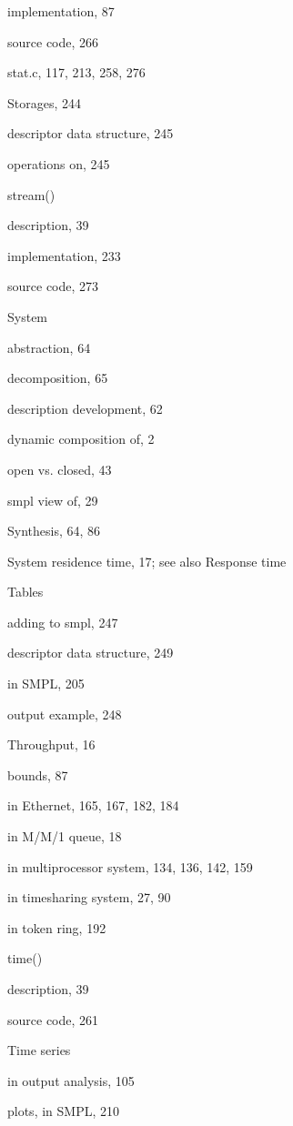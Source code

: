 \quad implementation, 87\par
\quad source code, 266\par
\noindent stat.c, 117, 213, 258, 276\par
\noindent Storages, 244\par
\quad descriptor data structure, 245\par
\quad operations on, 245\par
\noindent stream()\par
\quad description, 39\par
\quad implementation, 233\par
\quad source code, 273\par
\noindent System\par
\quad abstraction, 64\par
\quad decomposition, 65\par
\quad description development, 62\par
\quad dynamic composition of, 2\par
\quad open vs. closed, 43\par
\quad smpl view of, 29\par
\noindent Synthesis, 64, 86\par
\noindent System residence time, 17; see also Response time\par
\noindent Tables\par
\quad adding to smpl, 247\par
\quad descriptor data structure, 249\par
\quad in SMPL, 205\par
\quad output example, 248\par
\noindent Throughput, 16\par
\quad bounds, 87\par
\quad in Ethernet, 165, 167, 182, 184\par
\quad in M/M/1 queue, 18\par
\quad in multiprocessor system, 134, 136, 142, 159\par
\quad in timesharing system, 27, 90\par
\quad in token ring, 192\par
\noindent time()\par
\quad description, 39\par
\quad source code, 261\par
\noindent Time series\par
\quad in output analysis, 105\par
\quad plots, in SMPL, 210\par
